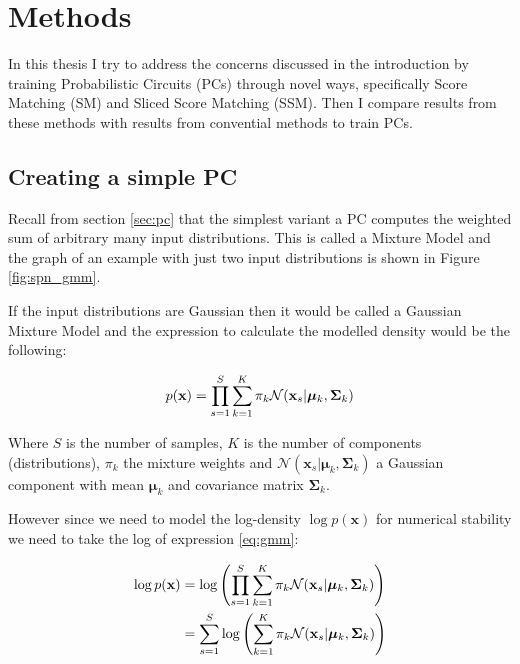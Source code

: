 \renewcommand{\vec}[1]{\textbf{#1}}

\chapter{Methods}
\label{cha:methods}

In this thesis I try to address the concerns discussed in the introduction by training 
Probabilistic Circuits (PCs) through novel ways, specifically Score Matching (SM) and Sliced Score Matching (SSM).
Then I compare results from these methods with results from convential methods to train PCs.\\

\section{Creating a simple PC}
\label{sec:simple_pc}

Recall from section \ref{sec:pc} that the simplest variant a PC computes the weighted sum of arbitrary many input distributions. This is 
called a Mixture Model and the graph of an example with just two input distributions is shown in Figure \ref{fig:spn_gmm}. 

If the input distributions are Gaussian then it would be called a Gaussian Mixture Model and the expression to calculate the 
modelled density would be the following: 

\begin{equation}
    p(\vec x) =  \prod_{s=1}^S \sum_{k=1}^K \pi_k \mathcal{N}(\vec x_s|\boldsymbol{\mu}_k, \boldsymbol{\Sigma}_k) \\
    \label{eq:gmm}
\end{equation}

Where $S$ is the number of samples, $K$ is the number of components (distributions), $\pi_k$ the mixture weights and $\mathcal{N}(\vec x_s|\boldsymbol{\mu}_k, \boldsymbol{\Sigma}_k)$ 
a Gaussian component with mean $\boldsymbol{\mu}_k$ and covariance matrix $\boldsymbol{\Sigma}_k$.

However since we need to model the log-density $\log p(\vec x)$ for numerical stability we need to take the log of expression \ref{eq:gmm}: 

\begin{align}
    \log p(\vec x) & = \log \left(\prod_{s=1}^S \sum_{k=1}^K \pi_k \mathcal{N}(\vec x_s|\boldsymbol{\mu}_k, \boldsymbol{\Sigma}_k)\right) \notag \\
    & =  \sum_{s=1}^S \log \left(\sum_{k=1}^K \pi_k \mathcal{N}(\vec x_s|\boldsymbol{\mu}_k, \boldsymbol{\Sigma}_k)\right) 
    \label{eq:gmm_logp}
\end{align}

